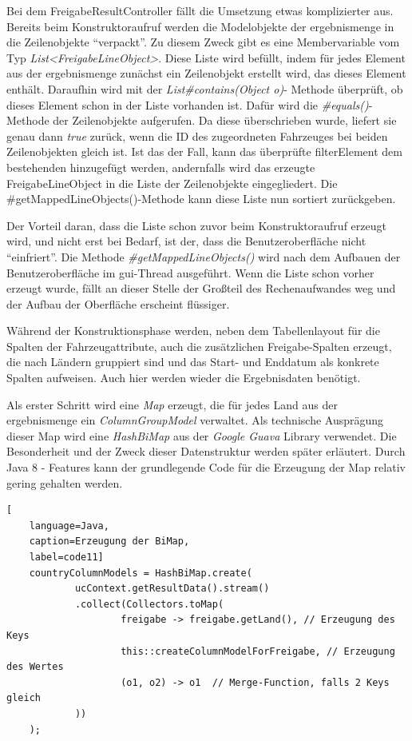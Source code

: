 Bei dem FreigabeResultController fällt die Umsetzung etwas komplizierter aus. Bereits beim Konstruktoraufruf werden die Modelobjekte der \gls{ergebnismenge} in die Zeilenobjekte \enquote{verpackt}. Zu diesem Zweck gibt es eine Membervariable vom Typ \textit{List<Frei\-ga\-be\-Line\-Ob\-ject>}. Diese Liste wird befüllt, indem für jedes Element aus der \gls{ergebnismenge} zunächst ein Zeilenobjekt erstellt wird, das dieses Element enthält. Daraufhin wird mit der \textit{List\#con\-tains(Ob\-ject o)}- Methode überprüft, ob dieses Element schon in der Liste vorhanden ist. Dafür wird die \textit{\#equals()}-Methode der Zeilenobjekte aufgerufen. Da diese überschrieben wurde, liefert sie genau dann \textit{true} zurück, wenn die ID des zugeordneten Fahrzeuges bei beiden Zeilenobjekten gleich ist. Ist das der Fall, kann das überprüfte \gls{filterElement} dem bestehenden hinzugefügt werden, andernfalls wird das erzeugte FreigabeLineObject in die Liste der Zeilenobjekte eingegliedert. Die \#getMappedLineObjects()-Methode kann diese Liste nun sortiert zurückgeben.

Der Vorteil daran, dass die Liste schon zuvor beim Konstruktoraufruf erzeugt wird, und nicht erst bei Bedarf, ist der, dass die Benutzeroberfläche nicht \enquote{einfriert}. Die Methode \textit{\#getMappedLineObjects()} wird nach dem Aufbauen der Benutzeroberfläche im \gls{gui}-Thread ausgeführt. Wenn die Liste schon vorher erzeugt wurde, fällt an dieser Stelle der Großteil des Rechenaufwandes weg und der Aufbau der Oberfläche erscheint flüssiger.

Während der Konstruktionsphase werden, neben dem Tabellenlayout für die Spalten der Fahrzeugattribute, auch die zusätzlichen Freigabe-Spalten erzeugt, die nach Ländern gruppiert sind und das Start- und Enddatum als konkrete Spalten aufweisen. Auch hier werden wieder die Ergebnisdaten benötigt.

Als erster Schritt wird eine \textit{Map} erzeugt, die für jedes Land aus der \gls{ergebnismenge} ein \textit{ColumnGroupModel} verwaltet. Als technische Ausprägung dieser Map wird eine \textit{HashBiMap} aus der \textit{Google Guava} Library verwendet. Die Besonderheit und der Zweck dieser Datenstruktur werden später erläutert. Durch Java 8 - Features kann der grundlegende Code für die Erzeugung der Map relativ gering gehalten werden.

\begin{lstlisting}[
    language=Java,
    caption=Erzeugung der BiMap,
    label=code11]
	countryColumnModels = HashBiMap.create(
			ucContext.getResultData().stream()
			.collect(Collectors.toMap(
					freigabe -> freigabe.getLand(),	// Erzeugung des Keys
					this::createColumnModelForFreigabe, // Erzeugung des Wertes
					(o1, o2) -> o1	// Merge-Function, falls 2 Keys gleich
	 		))
	);
\end{lstlisting}

